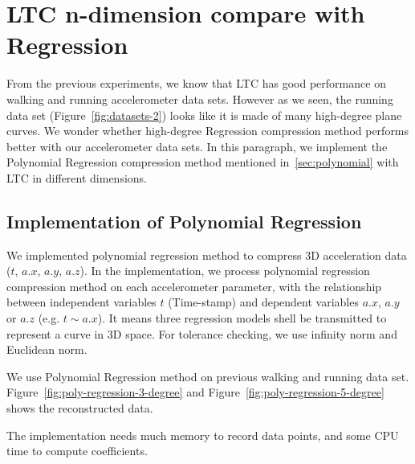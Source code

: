 \section{LTC n-dimension compare with Regression}

From the previous experiments, we know that LTC has good performance on 
walking and running accelerometer data sets. However as we seen, the running data set (Figure~\ref{fig:datasets-2}) looks like it is made of many high-degree plane curves.
We wonder whether high-degree Regression compression method performs better with our accelerometer data sets. In this
paragraph, we implement the Polynomial Regression compression method mentioned in~\ref{sec:polynomial} with LTC in different dimensions. 


\subsection{Implementation of Polynomial Regression}

We implemented polynomial regression method to compress 3D acceleration data
($t$, $a.x$, $a.y$, $a.z$). In the implementation, we process polynomial regression
compression method on each accelerometer parameter, with the relationship between independent variables $t$ (Time-stamp) and dependent
variables $a.x$, $a.y$ or $a.z$ (e.g. $t \sim a.x$). It means 
three regression models shell be transmitted to represent a curve in 3D space.
For tolerance checking, we use infinity norm
and Euclidean norm. 




We use Polynomial Regression method on previous walking and running data set.
Figure~\ref{fig:poly-regression-3-degree} and Figure~\ref{fig:poly-regression-5-degree} shows the reconstructed data. 


The implementation needs much memory to record data points,
and some CPU time to compute coefficients.


